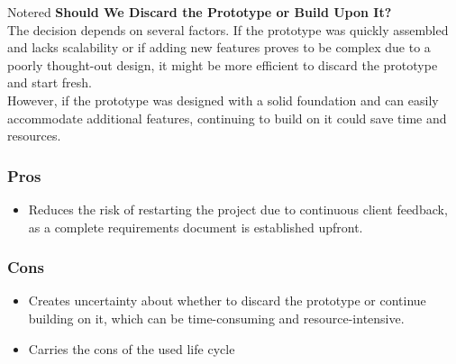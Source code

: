\vspace{0.5cm}
\begin{prettyBox}{Note}{red}
    \textbf{Should We Discard the Prototype or Build Upon It?}\\

    The decision depends on several factors. If the prototype was quickly assembled and lacks scalability or if adding 
    new features proves to be complex due to a poorly thought-out design, it might be more efficient to discard the
    prototype and start fresh.\\

    However, if the prototype was designed with a solid foundation and can easily accommodate additional features,
    continuing to build on it could save time and resources.
\end{prettyBox}

\vspace{1.5cm}
\begin{center}
\end{center}

\vspace{1cm}
\subsubsection{Pros}
\begin{itemize}
    \item Reduces the risk of restarting the project due to continuous client feedback, as a complete requirements
document is established upfront.
\end{itemize}

\subsubsection{Cons}
\begin{itemize}
    \item Creates uncertainty about whether to discard the prototype or continue building on it, which can be time-consuming 
and resource-intensive.
    \item Carries the cons of the used life cycle
\end{itemize}

